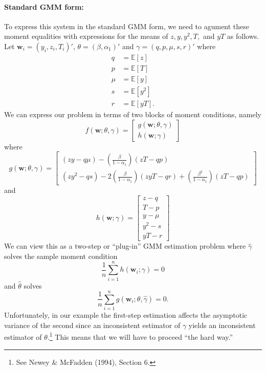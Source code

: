 \documentclass[12pt]{article}
\begin{document}
\paragraph{Standard GMM form:}
To express this system in the standard GMM form, we need to agument these moment equalities with expressions for the means of $z, y, y^2, T,$ and $yT$ as follows.
Let $\mathbf{w}_i = (y_i, z_i, T_i)'$, $\theta = (\beta, \alpha_1)'$ and $\gamma = (q, p, \mu, s, r)'$ where
\begin{align*}
  q &= \mathbb{E}\left[z \right] \\
  p &= \mathbb{E}\left[T \right] \\
  \mu &= \mathbb{E}\left[y \right] \\
  s &= \mathbb{E}\left[y^2 \right] \\
  r &= \mathbb{E}\left[yT \right].
\end{align*}
We can express our problem in terms of two blocks of moment conditions, namely
\[
  f(\mathbf{w}; \theta, \gamma) = \left[
  \begin{array}{c}
    g(\mathbf{w}; \theta, \gamma)\\
    h(\mathbf{w}; \gamma)
  \end{array}
\right]
\]
where
\[
  g(\mathbf{w}; \theta, \gamma) = \left[
  \begin{array}{c}
    (zy - q\mu) - \displaystyle\left( \frac{\beta}{1 - \alpha_1} \right)(zT - qp) \\
    (zy^2 - qs) - 2\displaystyle\left( \frac{\beta}{1 -\alpha_1}\right) (zyT - qr) + \left(\frac{\beta^2}{1 - \alpha_1}\right)(zT - qp)  
  \end{array}
\right]
\]
and
\[
  h(\mathbf{w}; \gamma) = 
  \left[
  \begin{array}{c}
    z - q \\ T - p \\ y - \mu \\ y^2 - s \\ yT - r
  \end{array}
\right]
\]
We can view this as a two-step or ``plug-in'' GMM estimation problem where $\widehat{\gamma}$ solves the sample moment condition
\[
  \frac{1}{n}\sum_{i=1}^n h(\mathbf{w}_i; \gamma) = 0
\]
and $\widehat{\theta}$ solves
\[
  \frac{1}{n}\sum_{i=1}^n g(\mathbf{w}_i; \theta, \widehat{\gamma}) = 0.
\]
Unfortunately, in our example the first-step estimation affects the asymptotic variance of the second since an inconsistent estimator of $\gamma$ yields an inconsistent estimator of $\theta$.\footnote{See Newey \& McFadden (1994), Section 6.}
This means that we will have to proceed ``the hard way.''
\end{document}
